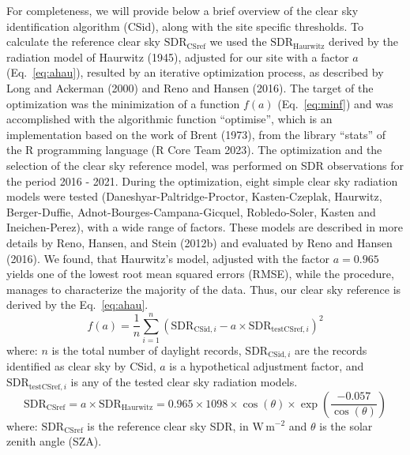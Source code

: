 \documentclass[
  preprint, 3p, authoryear]{article}
\begin{document}
For completeness, we will provide below a brief overview of the clear sky identification algorithm (CSid), along with the site specific thresholds.
To calculate the reference clear sky
\(\text{SDR}_\text{CSref}\) we used the \(\text{SDR}_\text{Haurwitz}\) derived by
the radiation model of Haurwitz (1945), adjusted for our site with a
factor \(a\) (Eq.~\ref{eq:ahau}), resulted by an iterative optimization process, as described
by Long and Ackerman (2000) and Reno and Hansen (2016).
The target of the optimization was the minimization of a function \(f(a)\) (Eq.~\ref{eq:minf}) and
was accomplished with the algorithmic function ``optimise'', which is an implementation based on the work of Brent (1973), from the library ``stats'' of the R programming language (R Core Team 2023).
The optimization and the selection of the clear sky reference model, was performed on SDR observations for the period 2016 - 2021.
During the optimization, eight simple clear sky radiation models were tested (Daneshyar-Paltridge-Proctor, Kasten-Czeplak, Haurwitz, Berger-Duffie, Adnot-Bourges-Campana-Gicquel, Robledo-Soler, Kasten and Ineichen-Perez), with a wide range of factors.
These models are described in more details by Reno, Hansen, and Stein (2012b) and evaluated by Reno and Hansen (2016).
We found, that Haurwitz's model, adjusted with the factor \(a = 0.965\) yields one of the lowest root mean squared errors (RMSE),
while the procedure, manages to characterize the majority of the data.
Thus, our clear sky reference is derived by the Eq.~\ref{eq:ahau}.
\begin{equation}
f(a) = \frac{1}{n}\sum_{i=1}^{n} ( \text{SDR}_{\text{CSid},i} - a \times \text{SDR}_{\text{testCSref},i} )^2 \label{eq:minf}
\end{equation}
where: \(n\) is the total number of daylight records, \(\text{SDR}_{\text{CSid},i}\) are the records identified as clear sky by CSid, \(a\) is a hypothetical adjustment factor, and \(\text{SDR}_{\text{testCSref},i}\) is any of the tested clear sky radiation models.
\begin{equation}
\text{SDR}_\text{CSref} = a \times \text{SDR}_\text{Haurwitz} = 0.965 \times 1098 \times \cos(\theta) \times \exp \left( \frac{ - 0.057}{\cos(\theta)} \right) \label{eq:ahau}
\end{equation}
where: \(\text{SDR}_\text{CSref}\) is the reference clear sky SDR, in \(\text{W}\,\text{m}^{-2}\) and \(\theta\) is the solar zenith angle (SZA).
\end{document}
